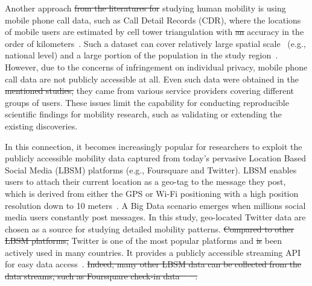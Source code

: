 \documentclass[ijgi,article,accept,moreauthors,pdftex,10pt,a4paper]{mdpi}
\theoremstyle{mdpi}
\newcounter{ex}
\newcounter{re}
\theoremstyle{mdpidefinition}
\providecommand{\DIFadd}[1]{{\protect\color{blue}\uwave{#1}}} %
\providecommand{\DIFdel}[1]{{\protect\color{red}\sout{#1}}}                      %
\providecommand{\DIFaddbegin}{} %
\providecommand{\DIFaddend}{} %
\providecommand{\DIFdelbegin}{} %
\providecommand{\DIFdelend}{} %
\begin{document}
Another approach \DIFdelbegin \DIFdel{from the literatures for }\DIFdelend \DIFaddbegin \DIFadd{to }\DIFaddend studying human mobility is using mobile phone call data, such as Call Detail Records (CDR), where the locations of mobile users are estimated by cell tower triangulation with \DIFdelbegin \DIFdel{an }\DIFdelend accuracy in the order of kilometers~\cite{gonzalez2008understanding,sevtsuk2010does,kung2014exploring}.
Such a dataset can cover relatively large spatial scale~\cite{becker2013human,sobolevsky2013delineating} (e.g., national level) and a large portion of the population in the study region~\cite{kung2014exploring}.
However, due to the concerns of infringement on individual privacy, mobile phone call data are not publicly accessible at all.
Even such data were obtained in the \DIFdelbegin \DIFdel{mentioned studies, }\DIFdelend \DIFaddbegin \DIFadd{aforementioned studies; }\DIFaddend they came from various service providers covering different groups of users.
These issues limit the capability for conducting reproducible scientific findings for mobility research, such as validating or extending the existing discoveries.

In this connection, it becomes increasingly popular for researchers to exploit the publicly accessible mobility data captured from today's pervasive Location Based Social Media (LBSM) platforms (e.g., Foursquare and Twitter).
LBSM enables users to attach their current location as a geo-tag to the message they post, which is derived from either the GPS or Wi-Fi positioning with a high position resolution down to 10 meters~\cite{Jurdak2015}.
A Big Data scenario emerges when millions \DIFaddbegin \DIFadd{of }\DIFaddend social media users constantly post messages.
In this study, geo-located Twitter data are chosen as a source for studying detailed mobility patterns.
\DIFdelbegin \DIFdel{Compared to other LBSM platforms, }\DIFdelend Twitter is one of the most popular platforms and \DIFdelbegin \DIFdel{is }\DIFdelend \DIFaddbegin \DIFadd{has }\DIFaddend been actively used in many countries.
It provides a publicly accessible streaming API for easy data access~\cite{twitterAPI}.
\DIFdelbegin \DIFdel{Indeed, many other LBSM data can be collected from the data streams, such as Foursquare check-in data~\mbox{%
\cite{cranshaw2012livehoods,hasan2013understanding}
}%
.
}\DIFdelend 
\end{document}
